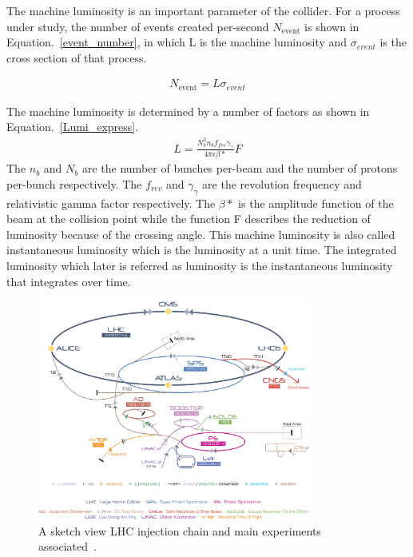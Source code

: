 The machine luminosity is an important parameter of the collider. For a process under study, the number of events created per-second $N_{\textrm{event}}$ is shown in Equation.~\ref{event_number}, in which L is the machine luminosity and $\sigma_{event}$ is the cross section of that process.

\begin{align}\label{event_number}
N_{\textrm{event}}=L\sigma_{event}
\end{align}

The machine luminosity is determined by a number of factors as shown in Equation.~\ref{Lumi_express}. 
\begin{align}\label{Lumi_express}
L=\frac{N_{b}^{2}n_{b}f_{fev}\gamma_{\gamma}}{4\pi\epsilon\beta*}F
\end{align}
The $n_b$ and $N_{b}$ are the number of bunches per-beam and the number of protons per-bunch respectively. The $f_{rev}$ and $\gamma_{\gamma}$ are the revolution frequency and relativistic gamma factor respectively. The $\beta*$ is the amplitude function of the beam at the collision point while the function F describes the reduction of luminosity because of the crossing angle. This machine luminosity is also called instantaneous luminosity which is the luminosity at a unit time. The integrated luminosity which later is referred as luminosity is the instantaneous luminosity that integrates over time.  



\begin{figure}[htbp] 
\centering
\includegraphics[width=0.8\textwidth]{chapter3/LHC_chain.jpg}
\caption{A sketch view LHC injection chain and main experiments associated~\cite{Christiane:1260465}.}
\label{fig:LHC_sketch}
\end{figure}


